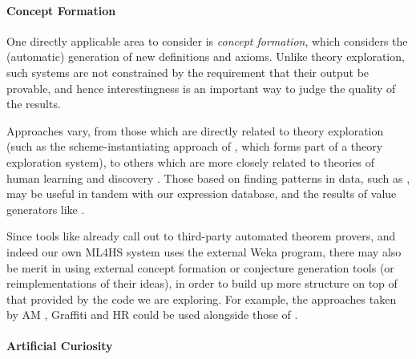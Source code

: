 \paragraph{Concept Formation} \label{sec:conceptformation} \leavevmode \newline

One directly applicable area to consider is \emph{concept formation}, which considers the (automatic) generation of new definitions and axioms. Unlike theory exploration, such systems are not constrained by the requirement that their output be provable, and hence interestingness is an important way to judge the quality of the results.

Approaches vary, from those which are directly related to theory exploration (such as the scheme-instantiating approach of \citep{Montano-Rivas.McCasland.Dixon.ea:2012}, which forms part of a theory exploration system), to others which are more closely related to theories of human learning and discovery \citep{Piantadosi.Tenenbaum.Goodman:2012, mullerunderstanding}. Those based on finding patterns in data, such as \citep{Wille:2005}, may be useful in tandem with our expression database, and the results of value generators like \qcheck{}.

Since tools like \hspec{} already call out to third-party automated theorem provers, and indeed our own ML4HS system uses the external Weka program, there may also be merit in using external concept formation or conjecture generation tools (or reimplementations of their ideas), in order to build up more structure on top of that provided by the code we are exploring. For example, the approaches taken by AM \citep{lenat1977automated, lenat1979automated}, Graffiti \citep{delavina2005some, delavina2005graffiti} and HR \citep{colton1999automatic, colton2000agent} could be used alongside those of \qspec{}.

\paragraph{Artificial Curiosity} \label{sec:curiosity} \leavevmode \newline


